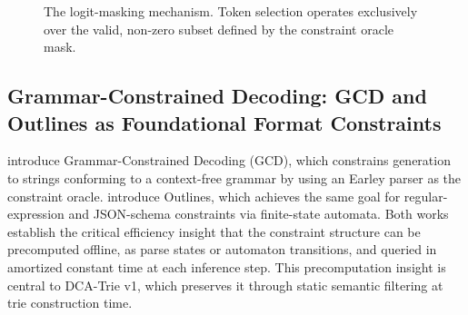 \begin{figure}[H]
{
    }
    \caption{The logit-masking mechanism. Token selection operates exclusively over the valid, non-zero subset defined by the constraint oracle mask.}
    \label{fig:logitmask}
\end{figure}

\subsection{Grammar-Constrained Decoding: GCD and Outlines as Foundational Format Constraints}

\citet{geng2023gcd} introduce Grammar-Constrained Decoding (GCD), which
constrains generation to strings conforming to a context-free grammar by
using an Earley parser as the constraint oracle. \citet{willard2023outlines}
introduce Outlines, which achieves the same goal for regular-expression and
JSON-schema constraints via finite-state automata. Both works establish the
critical efficiency insight that the constraint structure can be precomputed
offline, as parse states or automaton transitions, and queried in amortized
constant time at each inference step. This precomputation insight is central to
DCA-Trie v1, which preserves it through static semantic filtering at trie
construction time.

